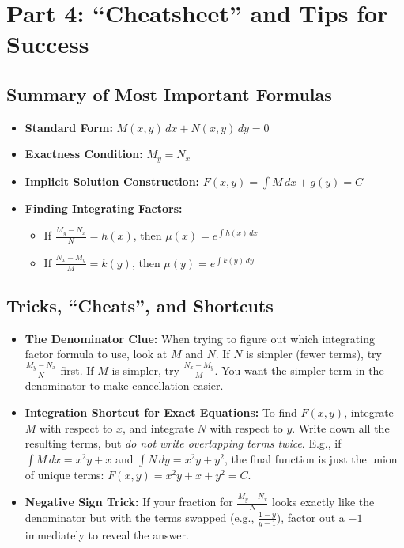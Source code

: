 \documentclass[11pt]{article}
\begin{document}
\newpage
\section*{Part 4: ``Cheatsheet'' and Tips for Success}

\subsection*{Summary of Most Important Formulas}
\begin{itemize}
    \item \textbf{Standard Form:} $M(x, y) \, dx + N(x, y) \, dy = 0$
    \item \textbf{Exactness Condition:} $M_y = N_x$
    \item \textbf{Implicit Solution Construction:} $F(x, y) = \int M \, dx + g(y) = C$
    \item \textbf{Finding Integrating Factors:}
    \begin{itemize}
        \item If $\frac{M_y - N_x}{N} = h(x)$, then $\mu(x) = e^{\int h(x) \, dx}$
        \item If $\frac{N_x - M_y}{M} = k(y)$, then $\mu(y) = e^{\int k(y) \, dy}$
    \end{itemize}
\end{itemize}

\subsection*{Tricks, ``Cheats'', and Shortcuts}
\begin{itemize}
    \item \textbf{The Denominator Clue:} When trying to figure out which integrating factor formula to use, look at $M$ and $N$. If $N$ is simpler (fewer terms), try $\frac{M_y - N_x}{N}$ first. If $M$ is simpler, try $\frac{N_x - M_y}{M}$. You want the simpler term in the denominator to make cancellation easier.
    \item \textbf{Integration Shortcut for Exact Equations:} To find $F(x, y)$, integrate $M$ with respect to $x$, and integrate $N$ with respect to $y$. Write down all the resulting terms, but \textit{do not write overlapping terms twice}. E.g., if $\int M \, dx = x^2y + x$ and $\int N \, dy = x^2y + y^2$, the final function is just the union of unique terms: $F(x, y) = x^2y + x + y^2 = C$.
    \item \textbf{Negative Sign Trick:} If your fraction for $\frac{M_y - N_x}{N}$ looks exactly like the denominator but with the terms swapped (e.g., $\frac{1 - y}{y - 1}$), factor out a $-1$ immediately to reveal the answer.
\end{itemize}
\end{document}

